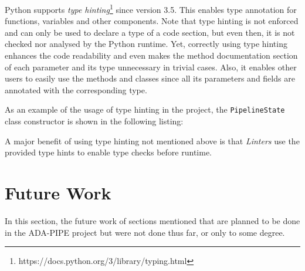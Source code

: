 \documentclass{article}
\begin{document}
        Python supports \emph{type hinting}\footnote{https://docs.python.org/3/library/typing.html} since version 3.5.
        This enables type annotation for functions, variables and other components.
        Note that type hinting is not enforced and can only be used to declare a type of a code section, but even then, it is not checked nor analysed by the Python runtime.
        Yet, correctly using type hinting enhances the code readability and even makes the method documentation section of each parameter and its type unnecessary in trivial cases. Also, it enables other users to easily use the methods and classes since all its parameters and fields are annotated with the corresponding type.

        As an example of the usage of type hinting in the project, the \texttt{PipelineState} class constructor is shown in the following listing:
        

        A major benefit of using type hinting not mentioned above is that \emph{Linters} use the provided type hints to enable type checks before runtime. 

\pagebreak
    \section{Future Work}
    \label{sec:future-work}

        In this section, the future work of sections mentioned that are planned to be done in the ADA-PIPE project but were not done thus far, or only to some degree.
\end{document}
